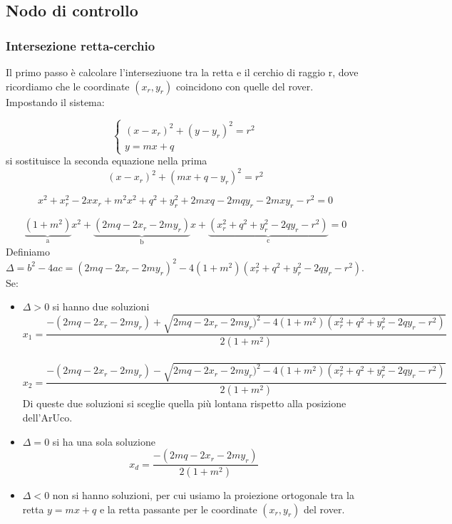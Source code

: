 \subsection{Nodo di controllo}

\subsubsection{Intersezione retta-cerchio}
Il primo passo è calcolare l'interseziuone tra la retta e il cerchio di raggio r, dove ricordiamo che le coordinate $(x_r,y_r)$ coincidono con quelle del rover. Impostando il sistema:

\begin{equation} 
\begin{cases}

    (x-x_r)^2+(y-y_r)^2=r^2
   \\
    y=mx+q 
  \end{cases} 
\end{equation}
si sostituisce la seconda equazione nella prima
\begin{equation}
(x-x_r)^2+(mx+q-y_r)^2=r^2
\end{equation}

\begin{equation}
x^2+x_r^2-2xx_r+m^2x^2+q^2+y_r^2+2mxq-2mqy_r-2mxy_r-r^2=0
\end{equation}

\begin{equation}
\underbrace{(1+m^2)}_\text{a}x^2+\underbrace{(2mq-2x_r-2my_r)}_\text{b}x+\underbrace{(x_r^2+q^2+y_r^2-2qy_r-r^2)}_\text{c}=0
\end{equation}
Definiamo $\Delta=b^2-4ac=(2mq-2x_r-2my_r)^2-4(1+m^2)(x_r^2+q^2+y_r^2-2qy_r-r^2)$. \\Se:
\begin{itemize}
    \item $\Delta>0$ si hanno due soluzioni
        \begin{equation}
        x_1=\frac{-(2mq-2x_r-2my_r)+\sqrt{2mq-2x_r-2my_r)^2-4(1+m^2)(x_r^2+q^2+y_r^2-2qy_r-r^2)}}{2(1+m^2)}
        \end{equation}
        \\
        \begin{equation}
        x_2=\frac{-(2mq-2x_r-2my_r)-\sqrt{2mq-2x_r-2my_r)^2-4(1+m^2)(x_r^2+q^2+y_r^2-2qy_r-r^2)}}{2(1+m^2)}
        \end{equation}
        Di queste due soluzioni si sceglie quella più lontana rispetto alla posizione dell'ArUco.
    \item $\Delta=0$ si ha una sola soluzione
    \begin{equation}
        x_d=\frac{-(2mq-2x_r-2my_r)}{2(1+m^2)}
        \end{equation}
    \item $\Delta<0$ non si hanno soluzioni, per cui usiamo la proiezione ortogonale tra la retta $y=mx+q$ e la retta passante per le coordinate $(x_r, y_r)$ del rover.
\end{itemize}
